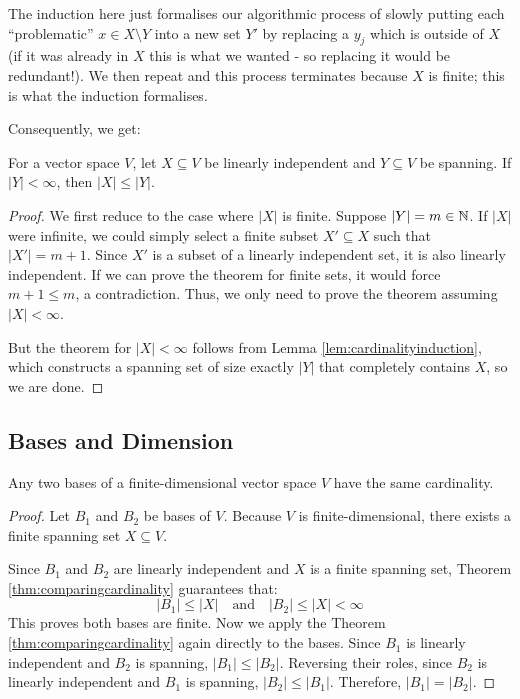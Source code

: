 \documentclass[../linear_algebra_and_groups.tex]{subfiles}
\begin{document}
\begin{remark}
    The induction here just formalises our algorithmic process of slowly putting each ``problematic'' $x\in X\setminus Y$ into a new set $Y'$ by replacing a $y_j$ which is outside of $X$ (if it was already in $X$ this is what we wanted - so replacing it would be redundant!). We then repeat and this process terminates because $X$ is finite; this is what the induction formalises.
\end{remark}

Consequently, we get:
\begin{theorem}
\label{thm:comparingcardinality}
    \begin{shaded*}
        For a vector space $V$, let $X \subseteq V$ be linearly independent and $Y \subseteq V$ be spanning. If $|Y| < \infty$, then $|X| \le |Y|$.
    \end{shaded*}
\end{theorem}
\begin{proof}
    We first reduce to the case where $|X|$ is finite. Suppose $|Y| = m \in \mathbb{N}$. If $|X|$ were infinite, we could simply select a finite subset $X' \subseteq X$ such that $|X'| = m + 1$. Since $X'$ is a subset of a linearly independent set, it is also linearly independent. If we can prove the theorem for finite sets, it would force $m + 1 \le m$, a contradiction. Thus, we only need to prove the theorem assuming $|X| < \infty$.
    
    But the theorem for $|X|<\infty$ follows from Lemma \ref{lem:cardinalityinduction}, which constructs a spanning set of size exactly $|Y|$ that completely contains $X$, so we are done.\qedhere
\end{proof}


\subsection{Bases and Dimension}

\begin{theorem}
    \begin{shaded*}
        Any two bases of a finite-dimensional vector space $V$ have the same cardinality.
    \end{shaded*}
\end{theorem}
\begin{proof}
    Let $B_1$ and $B_2$ be bases of $V$. Because $V$ is finite-dimensional, there exists a finite spanning set $X \subseteq V$. 
    
    Since $B_1$ and $B_2$ are linearly independent and $X$ is a finite spanning set, Theorem \ref{thm:comparingcardinality} guarantees that:
    \[ |B_1| \le |X| \quad \text{and} \quad |B_2| \le |X| < \infty \]
    This proves both bases are finite. Now we apply the Theorem \ref{thm:comparingcardinality} again directly to the bases. Since $B_1$ is linearly independent and $B_2$ is spanning, $|B_1| \le |B_2|$. Reversing their roles, since $B_2$ is linearly independent and $B_1$ is spanning, $|B_2| \le |B_1|$. Therefore, $|B_1| = |B_2|$.\qedhere
\end{proof}
\end{document}
